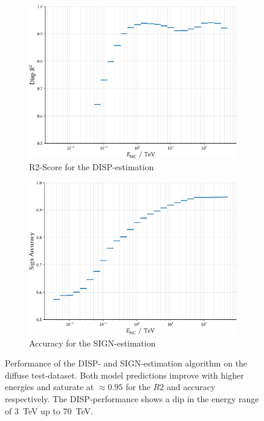 \begin{figure}
    \centering
    \captionsetup{width=0.9\linewidth}
    \begin{subfigure}{0.45\textwidth}
        \includegraphics[width=\linewidth]{../analysis/plots/disp_test_r2_equal_sized.pdf} 
        \caption{R2-Score for the DISP-estimation}
    \end{subfigure}
    \begin{subfigure}{0.45\textwidth}
        \includegraphics[width=\linewidth]{../analysis/plots/disp_test_acc_equal_sized.pdf}
        \caption{Accuracy for the SIGN-estimation}
    \end{subfigure}
    \caption{
    	Performance of the DISP- and SIGN-estimation algorithm on the diffuse test-dataset.
	Both model predictions improve with higher energies and saturate
	at $\approx\num{0.95}$ for the $R2$ and accuracy respectively.
    The DISP-performance shows a dip in the energy range of \SI{3}{\tera\electronvolt}
    up to \SI{70}{\tera\electronvolt}.}
    \label{fig:disp_test_perf}
\end{figure}

